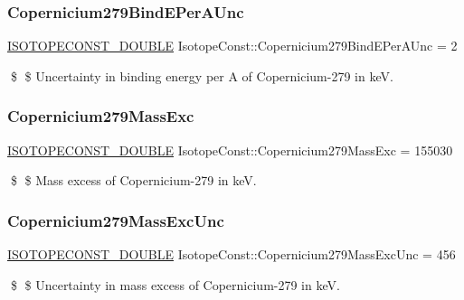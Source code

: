 \subsubsection{\texorpdfstring{Copernicium279\+Bind\+E\+Per\+A\+Unc}{Copernicium279BindEPerAUnc}}
{\footnotesize\ttfamily \mbox{\hyperlink{group___isotope_const-_macros_ga8f45a7272ce02c0b4c65c44636ed719a}{I\+S\+O\+T\+O\+P\+E\+C\+O\+N\+S\+T\+\_\+\+D\+O\+U\+B\+LE}} Isotope\+Const\+::\+Copernicium279\+Bind\+E\+Per\+A\+Unc = 2}

\$ \$ Uncertainty in binding energy per A of Copernicium-\/279 in keV. \mbox{\label{group___isotope_const-_copernicium-_cn279_gadec08420c6d7d85b190cbe47e9d2bef0}} 
\subsubsection{\texorpdfstring{Copernicium279\+Mass\+Exc}{Copernicium279MassExc}}
{\footnotesize\ttfamily \mbox{\hyperlink{group___isotope_const-_macros_ga8f45a7272ce02c0b4c65c44636ed719a}{I\+S\+O\+T\+O\+P\+E\+C\+O\+N\+S\+T\+\_\+\+D\+O\+U\+B\+LE}} Isotope\+Const\+::\+Copernicium279\+Mass\+Exc = 155030}

\$ \$ Mass excess of Copernicium-\/279 in keV. \mbox{\label{group___isotope_const-_copernicium-_cn279_ga1037336228145c5ae2f1b4c997bb9a94}} 
\subsubsection{\texorpdfstring{Copernicium279\+Mass\+Exc\+Unc}{Copernicium279MassExcUnc}}
{\footnotesize\ttfamily \mbox{\hyperlink{group___isotope_const-_macros_ga8f45a7272ce02c0b4c65c44636ed719a}{I\+S\+O\+T\+O\+P\+E\+C\+O\+N\+S\+T\+\_\+\+D\+O\+U\+B\+LE}} Isotope\+Const\+::\+Copernicium279\+Mass\+Exc\+Unc = 456}

\$ \$ Uncertainty in mass excess of Copernicium-\/279 in keV. \mbox{\label{group___isotope_const-_copernicium-_cn279_ga9314ba7fe0a2f095a6f86ea7193359ab}} 
